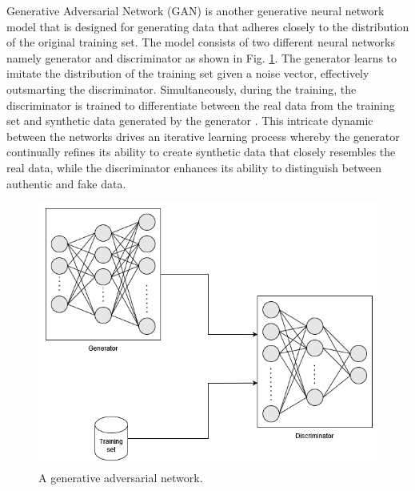 \documentclass[preprint,12pt]{elsarticle}
\begin{document}
Generative Adversarial Network (GAN) is another generative neural network model that is designed for generating data that adheres closely to the distribution of the original training set. The model consists of two different neural networks namely generator and discriminator as shown in Fig. \ref{fig_deep_unsv_learning_gan}. The generator learns to imitate the distribution of the training set given a noise vector, effectively outsmarting the discriminator. Simultaneously, during the training, the discriminator is trained to differentiate between the real data from the training set and synthetic data generated by the generator \citep{goodfellow_generative_2014}. This intricate dynamic between the networks drives an iterative learning process whereby the generator continually refines its ability to create synthetic data that closely resembles the real data, while the discriminator enhances its ability to distinguish between authentic and fake data.

\begin{figure}[h!]
    \centering
    \includegraphics[scale=0.6]{fig_deep_unsv_learning_gan.png}
    \caption{A generative adversarial network.}
    \label{fig_deep_unsv_learning_gan}
\end{figure}
\end{document}
